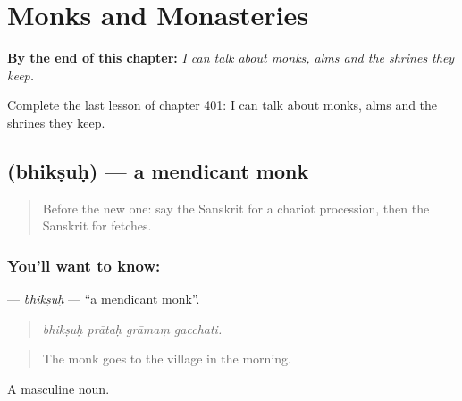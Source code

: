 
\chapter{Monks and Monasteries}
\label{ch:sa-monks-and-monasteries}

\begin{chapteropening}
\textbf{By the end of this chapter:} \emph{I can talk about monks, alms and the shrines they keep.}

Complete the last lesson of chapter 401: I can talk about monks, alms and the shrines they keep.
\end{chapteropening}

\section[\texorpdfstring{\sk{भिक्षुः} (bhikṣuḥ)}{भिक्षुः (bhikṣuḥ)}]{ (bhikṣuḥ) — a mendicant monk}

\label{lesson:SA-C401-bhiksuh}



\begin{quote}
Before the new one: say the Sanskrit for a chariot procession, then the Sanskrit for fetches.
\end{quote}

\subsection*{You'll want to know: }
\textbf{} — \emph{bhikṣuḥ} — \textquotedblleft{}a mendicant monk\textquotedblright{}.

\begin{quote}
   
\end{quote}

\begin{quote}
\emph{bhikṣuḥ prātaḥ grāmaṃ gacchati.}
\end{quote}

\begin{quote}
The monk goes to the village in the morning.
\end{quote}

A masculine noun.

